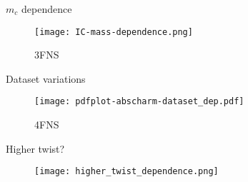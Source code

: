 \begin{frame}{$m_c$ dependence}
  \begin{figure}
    \texttt{[image: IC-mass-dependence.png]}
    \caption*{3FNS}
  \end{figure}
\end{frame}

\begin{frame}{Dataset variations}
  \begin{figure}
    \texttt{[image: pdfplot-abscharm-dataset\_dep.pdf]}
    \caption*{4FNS}
  \end{figure}
\end{frame}

\begin{frame}{Higher twist?}
  \begin{figure}
    \texttt{[image: higher\_twist\_dependence.png]}
  \end{figure}
\end{frame}